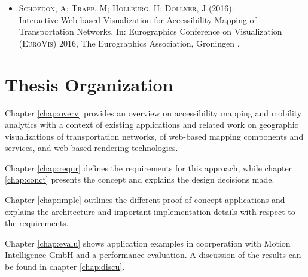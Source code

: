     \begin{itemize}
      \item \textsc{Schoedon, A; Trapp, M; Hollburg, H; Döllner,
        J (2016)}:\\ Interactive Web-based Visualization for Accessibility
        Mapping of Transportation Networks. In: Eurographics Conference on
        Visualization (\textsc{EuroVis}) 2016, The Eurographics Association,
        Groningen \cite{STHD2016}.
    \end{itemize}

  \section{Thesis Organization}
    \label{sec:intro:organ}
    Chapter \ref{chap:overv} provides an overview on accessibility mapping and
    mobility analytics with a context of existing applications and related work
    on geographic visualizations of transportation networks, of web-based
    mapping components and services, and web-based rendering technologies.\par

    Chapter \ref{chap:requr} defines the requirements for this approach, while
    chapter \ref{chap:conct} presents the concept and explains the design
    decisions made.\par

    Chapter \ref{chap:imple} outlines the different proof-of-concept
    applications and explains the architecture and important implementation
    details with respect to the requirements.\par

    Chapter \ref{chap:evalu} shows application examples in coorperation
    with Motion Intelligence GmbH and a performance evaluation. A discussion of
    the results can be found in chapter \ref{chap:discu}.\par
